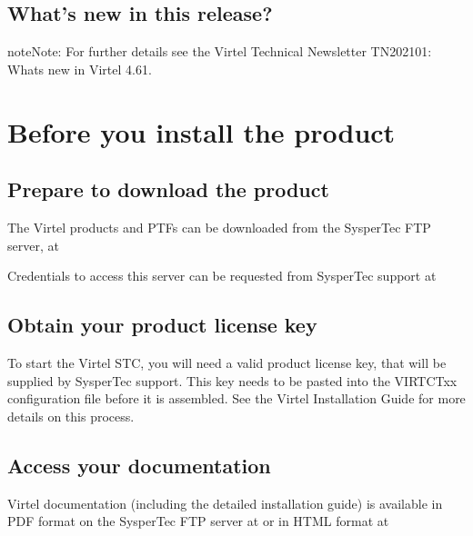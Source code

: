 \documentclass[letterpaper,10pt,english]{sphinxmanual}
\begin{document}
\section{What’s new in this release?}
\label{\detokenize{Getting_Started:what-s-new-in-this-release}}
\begin{sphinxadmonition}{note}{Note:}
\sphinxAtStartPar
For further details see the Virtel Technical Newsletter TN202101: Whats new in Virtel 4.61.
\end{sphinxadmonition}


\chapter{Before you install the product}
\label{\detokenize{Getting_Started:before-you-install-the-product}}

\section{Prepare to download the product}
\label{\detokenize{Getting_Started:prepare-to-download-the-product}}
\sphinxAtStartPar
The Virtel products and PTFs can be downloaded from the SysperTec FTP server, at 

\sphinxAtStartPar
Credentials to access this server can be requested from SysperTec support at 


\section{Obtain your product license key}
\label{\detokenize{Getting_Started:obtain-your-product-license-key}}
\sphinxAtStartPar
To start the Virtel STC, you will need a valid product license key, that will be supplied by SysperTec support. This key needs to be pasted into the VIRTCTxx configuration file before it is assembled. See the Virtel Installation Guide for more details on this process.


\section{Access your documentation}
\label{\detokenize{Getting_Started:access-your-documentation}}
\sphinxAtStartPar
Virtel documentation (including the detailed installation guide) is available in PDF format on the SysperTec FTP server at  or in HTML format at 
\end{document}
